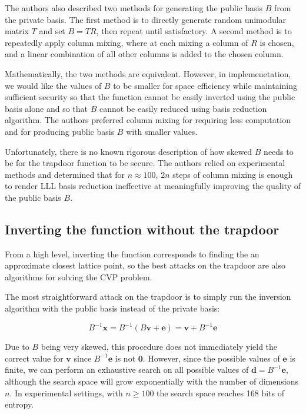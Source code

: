 The authors also described two methods for generating the public basis $B$ from the private basis. The first method is to directly generate random unimodular matrix $T$ and set $B = TR$, then repeat until satisfactory. A second method is to repeatedly apply column mixing, where at each mixing a column of $R$ is chosen, and a linear combination of all other columns is added to the chosen column.

Mathematically, the two methods are equivalent. However, in implemenetation, we would like the values of $B$ to be smaller for space efficiency while maintaining sufficient security so that the function cannot be easily inverted using the public basis alone and so that $B$ cannot be easily reduced using basis reduction algorithm. The authors preferred column mixing for requiring less computation and for producing public basis $B$ with smaller values.

Unfortunately, there is no known rigorous description of how skewed $B$ needs to be for the trapdoor function to be secure. The authors relied on experimental methods and determined that for $n \approx 100$, $2n$ steps of column mixing is enough to render LLL basis reduction ineffective at meaningfully improving the quality of the public basis $B$.

\subsection{Inverting the function without the trapdoor}
From a high level, inverting the function corresponds to finding the an approximate closest lattice point, so the best attacks on the trapdoor are also algorithms for solving the CVP problem.

The most straightforward attack on the trapdoor is to simply run the inversion algorithm with the public basis instead of the private basis:

$$
B^{-1}\mathbf{x} = B^{-1}(B\mathbf{v} + \mathbf{e}) = \mathbf{v} + B^{-1}\mathbf{e}
$$

Due to $B$ being very skewed, this procedure does not immediately yield the correct value for $\mathbf{v}$ since $B^{-1}\mathbf{e}$  is not $\mathbf{0}$. However, since the possible values of $\mathbf{e}$ is finite, we can perform an exhaustive search on all possible values of $\mathbf{d} = B^{-1}\mathbf{e}$, although the search space will grow exponentially with the number of dimensions $n$. In experimental settings, with $n \geq 100$ the search space reaches 168 bits of entropy.

